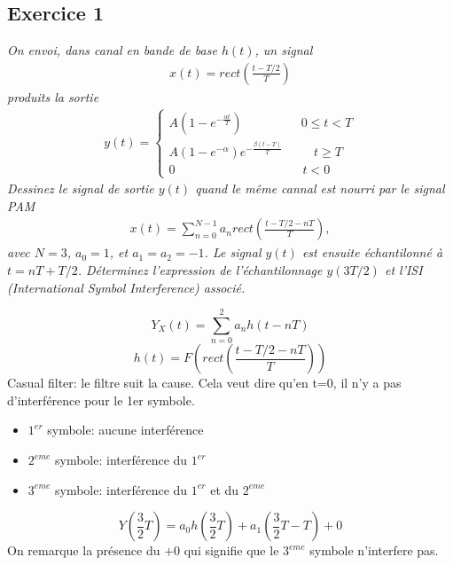 \subsection{Exercice 1}
\textit{On envoi, dans canal en bande de base $h(t)$, un signal
\begin{eqnarray}x(t)=rect\left(\frac{t-T/2}{T}\right)\end{eqnarray}
produits la sortie
\begin{eqnarray}
y(t)=
\left\lbrace
\begin{array}{lll}
	A(1-e^{-\frac{\alpha t}{T}})\;\;\;\;\;\;\;\;\;\;\;\;\;\;\;\;\;0\leq t < T\\
	A(1-e^{-\alpha})e^{-\frac{\beta(t-T)}{T}}\;\;\;\;\;\;\;\;\;t \geq T\\
	0\;\;\;\;\;\;\;\;\;\;\;\;\;\;\;\;\;\;\;\;\;\;\;\;\;\;\;\;\;\;\;\;\;\;\;\;\;t < 0
\end{array}
\right.
\end{eqnarray}
Dessinez le signal de sortie $y(t)$ quand le même cannal est nourri par le signal PAM
\begin{eqnarray}
	x(t)=\sum_{n=0}^{N-1}a_{n}rect\left(\frac{t-T/2-nT}{T}\right),
\end{eqnarray}
avec $N=3$, $a_0=1$, et $a_1=a_2=-1$. Le signal $y(t)$ est ensuite échantilonné à $t=nT+T/2$. Déterminez l'expression de l'échantilonnage $y(3T/2)$ et l'ISI (International Symbol Interference) associé.}
\begin{framed}
	\[ Y_X(t)=\sum_{n=0}^2a_{n}h(t-nT) \]
	\[ h(t) = F\left(rect\left(\frac{t-T/2-nT}{T}\right)\right) \]
Casual filter: le filtre suit la cause. Cela veut dire qu'en t=0, il n'y a pas d'interférence pour le 1er symbole.
\begin{itemize}
	\item $1^{er}$ symbole: aucune interférence
	\item $2^{eme}$ symbole: interférence du $1^{er}$
	\item $3^{eme}$ symbole: interférence du $1^{er}$ et du $2^{eme}$
\end{itemize}
	\[ Y\left(\frac{3}{2}T\right) = a_0h\left(\frac{3}{2}T\right) +  a_1\left(\frac{3}{2}T-T\right)+0 \]
On remarque la présence du $+ 0$ qui signifie que le $3^{eme}$ symbole n'interfere pas.
\end{framed}

